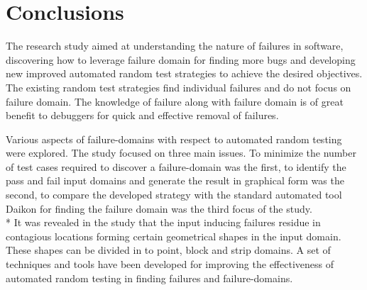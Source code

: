 
\chapter{Conclusions}
\label{chap:conclusions_7}



The research study aimed at understanding the nature of failures in software, discovering how to leverage failure domain for finding more bugs and developing new improved automated random test strategies to achieve the desired objectives. The existing random test strategies find individual failures and do not focus on failure domain. The knowledge of failure along with failure domain is of great benefit to debuggers for quick and effective removal of failures.

Various aspects of failure-domains with respect to automated random testing were explored. The study focused on three main issues. To minimize the number of test cases required to discover a failure-domain was the first, to identify the pass and fail input domains and generate the result in graphical form was the second, to compare the developed strategy with the standard automated tool Daikon for finding the failure domain was the third focus of the study.\\* 
It was revealed in the study that the input inducing failures residue in contagious locations forming certain geometrical shapes in the input domain. These shapes can be divided in to point, block and strip domains. A set of techniques and tools have been developed for improving the effectiveness of automated random testing in finding failures and failure-domains. 






